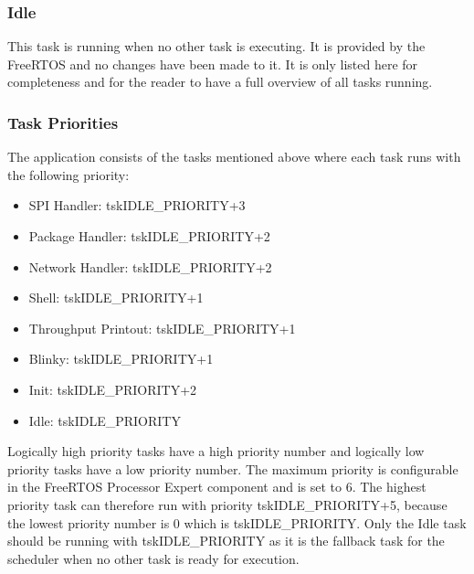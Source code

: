 \subsubsection{Idle}
This task is running when no other task is executing. It is provided by the FreeRTOS and no changes have been made to it. It is only listed here for completeness and for the reader to have a full overview of all tasks running.
%
\subsubsection{Task Priorities} \label{subsec:txtTaskPriorities}
The application consists of the tasks mentioned above where each task runs with the following priority:
\begin{itemize}
    \item SPI Handler:			\tab tskIDLE\_PRIORITY+3
    \item Package Handler:		\tab tskIDLE\_PRIORITY+2
    \item Network Handler:		\tab tskIDLE\_PRIORITY+2
    \item Shell:				\tab tskIDLE\_PRIORITY+1
    \item Throughput Printout:	\tab tskIDLE\_PRIORITY+1
    \item Blinky:				\tab tskIDLE\_PRIORITY+1
    \item Init:					\tab tskIDLE\_PRIORITY+2
    \item Idle:					\tab tskIDLE\_PRIORITY
\end{itemize}
Logically high priority tasks have a high priority number and logically low priority tasks have a low priority number. The maximum priority is configurable in the FreeRTOS Processor Expert component and is set to 6. The highest priority task can therefore run with priority tskIDLE\_PRIORITY+5, because the lowest priority number is 0 which is tskIDLE\_PRIORITY. Only the Idle task should be running with tskIDLE\_PRIORITY as it is the fallback task for the scheduler when no other task is ready for execution.
%
